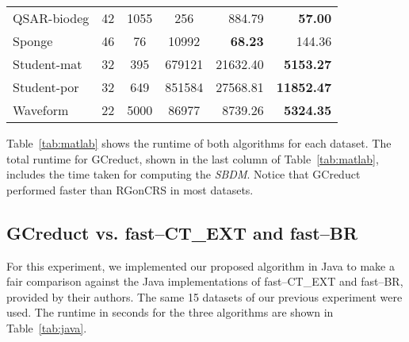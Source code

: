 \documentclass[authoryear,11pt]{elsarticle}
\begin{document}
\begin{table}[!htb]
\begin{tabular}{|l|c|c|c|r|r|}
		QSAR-biodeg               & 42         & 1055      & 256      &  884.79           & \textbf{57.00}     \\
		Sponge                    & 46         & 76        & 10992    & \textbf{68.23}    & 144.36             \\
		Student-mat               & 32         & 395       & 679121   & 21632.40          & \textbf{5153.27}   \\
		Student-por               & 32         & 649       & 851584   & 27568.81          & \textbf{11852.47}  \\
		Waveform                  & 22         & 5000      & 86977    & 8739.26           & \textbf{5324.35}   \\				
		\hline
	\end{tabular}
\end{table}

  Table~\ref{tab:matlab} shows the runtime of both algorithms for each dataset. The total runtime for GCreduct, shown in the last column of Table~\ref{tab:matlab}, includes the time taken for computing the \textit{SBDM}. Notice that GCreduct performed faster than RGonCRS in most datasets.

\subsection{GCreduct vs. fast--CT\_EXT and fast--BR}\label{sub:java}

  For this experiment, we implemented our proposed algorithm in Java to make a fair comparison against the Java implementations of fast--CT\_EXT and fast--BR, provided by their authors. The same 15 datasets of our previous experiment were used. The runtime in seconds for the three algorithms are shown in Table~\ref{tab:java}. 
\end{document}
